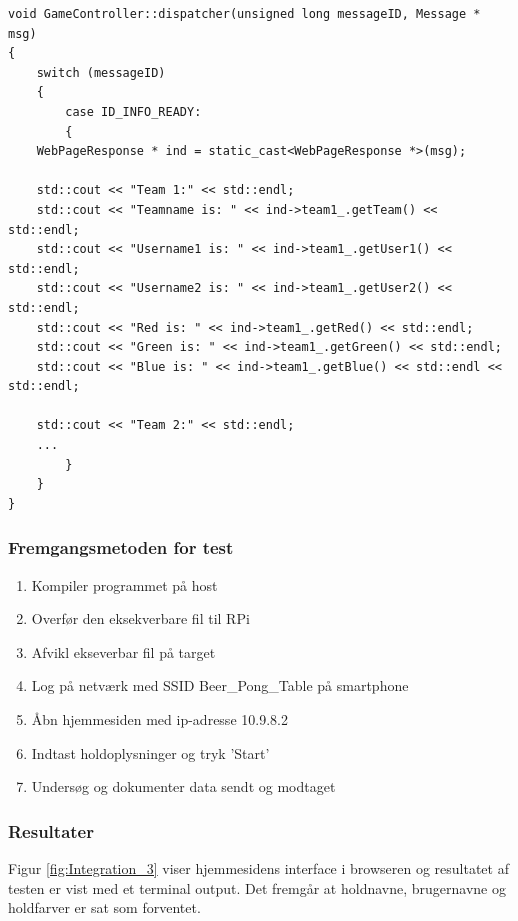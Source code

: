 \documentclass[Integrationstest/Integrationstest_main.tex]{subfiles}
\begin{document}
\begin{lstlisting}
void GameController::dispatcher(unsigned long messageID, Message * msg)
{
    switch (messageID) 
    {
        case ID_INFO_READY:
        {
	WebPageResponse * ind = static_cast<WebPageResponse *>(msg);

	std::cout << "Team 1:" << std::endl;
	std::cout << "Teamname is: " << ind->team1_.getTeam() << std::endl;
	std::cout << "Username1 is: " << ind->team1_.getUser1() << std::endl;
	std::cout << "Username2 is: " << ind->team1_.getUser2() << std::endl;
	std::cout << "Red is: " << ind->team1_.getRed() << std::endl;
	std::cout << "Green is: " << ind->team1_.getGreen() << std::endl;
	std::cout << "Blue is: " << ind->team1_.getBlue() << std::endl << std::endl;

	std::cout << "Team 2:" << std::endl;
	...
    	}
    }
}
\end{lstlisting}

\subsubsection{Fremgangsmetoden for test}
\begin{enumerate}
    \item Kompiler programmet på host
    \item Overfør den eksekverbare fil til RPi 
    \item Afvikl ekseverbar fil på target
    \item Log på netværk med SSID Beer\_Pong\_Table på smartphone
    \item Åbn hjemmesiden med ip-adresse 10.9.8.2
    \item Indtast holdoplysninger og tryk 'Start'
    \item Undersøg og dokumenter data sendt og modtaget 
\end{enumerate}

\subsubsection{Resultater}
Figur \ref{fig:Integration_3} viser hjemmesidens interface i browseren og resultatet af testen er vist med et terminal output. Det fremgår at holdnavne, brugernavne og holdfarver er sat som forventet.
\end{document}
